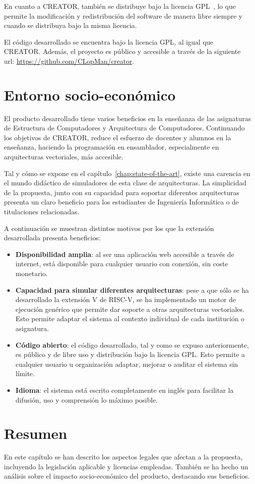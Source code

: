 En cuanto a CREATOR, también se distribuye bajo la licencia GPL~\cite{gnu-license}, lo que permite la modificación y redistribución del software de manera libre siempre y cuando se distribuya bajo la misma licencia.

El código desarrollado se encuentra bajo la licencia GPL, al igual que CREATOR. Además, el proyecto es público y accesible a través de la siguiente url: \url{https://github.com/CLopMan/creator}.

\section{Entorno socio-económico}\label{sec:socio-economico}

El producto desarrollado tiene varios beneficios en la enseñanza de las asignaturas de Estructura de Computadores y Arquitectura de Computadores. Continuando los objetivos de CREATOR, reduce el esfuerzo de docentes y alumnos en la enseñanza, haciendo la programación en ensamblador, especialmente en arquitecturas vectoriales, más accesible.

Tal y cómo se expone en el capítulo~\ref{chap:state-of-the-art}, existe una carencia en el mundo didáctico de simuladores de esta clase de arquitecturas. La simplicidad de la propuesta, junto con su capacidad para soportar diferentes arquitecturas presenta un claro beneficio para los estudiantes de Ingeniería Informática o de titulaciones relacionadas.

A continuación se muestran distintos motivos por los que la extensión desarrollada presenta beneficios:
\begin{itemize}
    \item \textbf{Disponibilidad amplia}: al ser una aplicación web accesible a través de internet, está disponible para cualquier usuario con conexión, sin coste monetario.
    \item \textbf{Capacidad para simular diferentes arquitecturas}: pese a que sólo se ha desarrollado la extensión V de RISC-V, se ha implementado un motor de ejecución genérico que permite dar soporte a otras arquitecturas vectoriales. Esto permite adaptar el sistema al contexto individual de cada institución o asignatura.
    \item\textbf{Código abierto}: el código desarrollado, tal y como se expuso anteriormente, es público y de libre uso y distribución bajo la licencia GPL. Esto permite a cualquier usuario u organización adaptar, mejorar o auditar el sistema sin límite.
    \item\textbf{Idioma}: el sistema está escrito completamente en inglés para facilitar la difusión, uso y comprensión lo máximo posible.
\end{itemize}

\section{Resumen}
En este capítulo se han descrito los aspectos legales que afectan a la propuesta, incluyendo la legislación aplicable y licencias empleadas. También se ha hecho un análisis sobre el impacto socio-económico del producto, destacando sus beneficios.
